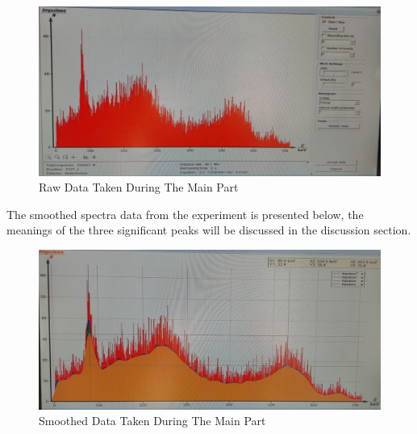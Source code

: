 		\begin{figure}[h!]
			\caption{Raw Data Taken During The Main Part}
			\centering
			\includegraphics[width=\textwidth * 2/ 2]{images/raw_spectra.png}
		\end{figure}

	
		The smoothed spectra data from the experiment is presented below, the meanings of the three significant peaks will be discussed in the discussion section.
		\begin{figure}[h!]
			\caption{Smoothed Data Taken During The Main Part}
			\centering
			\includegraphics[width=\textwidth * 2/ 2]{images/smoothed_spectra.png}
		\end{figure}
	
